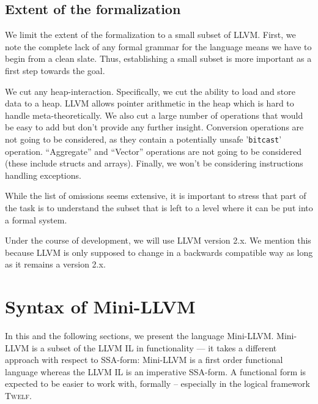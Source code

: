 \documentclass[a4paper, oneside, 10pt, draft]{memoir}
\newcommand{\twelf}{\textsc{Twelf}}
\begin{document}
\section{Extent of the formalization}

We limit the extent of the formalization to a small subset of
LLVM. First, we note the complete lack of any formal grammar for
the language means we have to begin from a clean slate. Thus,
establishing a small subset is more important as a first step towards
the goal.

We cut any heap-interaction. Specifically, we cut the ability to
load and store data to a heap. LLVM allows pointer arithmetic in the
heap which is hard to handle meta-theoretically. We also cut a large
number of operations that would be easy to add but don't provide
any further insight. Conversion operations are not going to be
considered, as they contain a potentially unsafe '\texttt{bitcast}'
operation. ``Aggregate'' and ``Vector'' operations are not going to be
considered (these include structs and arrays). Finally, we won't be
considering instructions handling exceptions.

While the list of omissions seems extensive, it is important to stress
that part of the task is to understand the subset that is left to a
level where it can be put into a formal system.

Under the course of development, we will use LLVM version 2.x. We
mention this because LLVM is only supposed to change in a backwards
compatible way as long as it remains a version 2.x.

\chapter{Syntax of Mini-LLVM}

\newcommand{\variables}{\mathrm{Variables}}
\newcommand{\BBlabels}{\mathrm{Labels}}
\newcommand{\tnat}{\mathbf{nat}}
\newcommand{\tbool}{\mathbf{bool}}
\newcommand{\types}{\mathrm{Types}}
\newcommand{\typelist}{\mathrm{Type lists}}
\newcommand{\bbtype}{\mathrm{Label Type}}
\newcommand{\ftype}{\mathrm{Fun Contexts}}
\newcommand{\tpenv}{\mathrm{Var Contexts}}
\newcommand{\bbenv}{\mathrm{Label Contexts}}
\newcommand{\bor}{\; \vert \;}
\newcommand{\ntypes}{\tau_1 \times \tau_2 \times \dotsb \times \tau_n}
\newcommand{\ntypesp}{\tau'_1 \times \tau'_2 \times \dotsb \times
  \tau'_n}
\newcommand{\ntypespp}{\tau_1 \times \tau_2 \times \dotsb \times \tau_{n'}}
In this and the following sections, we present the language
Mini-LLVM. Mini-LLVM is a subset of the LLVM IL in functionality ---
it takes a different approach with respect to SSA-form: Mini-LLVM is a
first order functional language whereas the LLVM IL is an imperative
SSA-form. A functional form is expected to be easier to work with,
formally -- especially in the logical framework \twelf{}.
\end{document}

